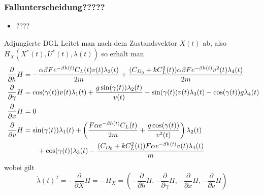 \documentclass[aspectratio=169]{beamer}
\begin{document}
\begin{frame}
  \frametitle{Fallunterscheidung?????}
\vspace{-2.6cm}
  \begin{itemize}
    \item ????
  \end{itemize}
\end{frame}


\begin{frame}
  \begin{block}{Adjungierte DGL}  
  \scriptsize
Leitet man nach dem Zustandsvektor $X(t)$ ab, also $H_{X}(X^{\ast}(t),U^{\ast}(t),\lambda(t))$ so erhält man 
        \[\begin{split}
            \dfrac{\partial}{\partial h} H &= - \dfrac{\alpha \beta F e^{-\beta h(t)} C_L(t) v(t) \lambda_2(t)}{2m} + \dfrac{(C_{D_0}+k C_L^2(t)) \alpha \beta F e^{-\beta h(t)} v^2(t) \lambda_4(t)}{2m} \\\
            \dfrac{\partial}{\partial \gamma} H &= \cos(\gamma(t)) v(t) \lambda_1(t) + \dfrac{g \sin(\gamma(t)) \lambda_2(t)}{v(t)} - \sin(\gamma(t)) v(t) \lambda_3(t) - \cos(\gamma(t)) g \lambda_4(t) \\\
            \dfrac{\partial}{\partial x} H &= 0 \\\
            \dfrac{\partial}{\partial v} H &= \sin(\gamma(t)) \lambda_1(t) + \left( \dfrac{F \alpha e^{-\beta h(t)} C_L(t)}{2m} + \dfrac{g \cos(\gamma(t))}{v^2(t)} \right) \lambda_2(t) \\\
            &\hspace{7mm} + \cos(\gamma(t)) \lambda_3(t) - \dfrac{(C_{D_0} + k C_L^2(t)) F \alpha e^{-\beta h(t)} v(t) \lambda_4(t)}{m}
        \end{split}\]
        wobei gilt 
        \[\dot{\lambda}(t)^T = - \dfrac{\partial}{\partial X} H = -H_{X} = \left( -\dfrac{\partial}{\partial h} H, -\dfrac{\partial}{\partial \gamma} H, -\dfrac{\partial}{\partial x} H, -\dfrac{\partial}{\partial v} H \right)\]
  \end{block}
\end{frame}
\end{document}
